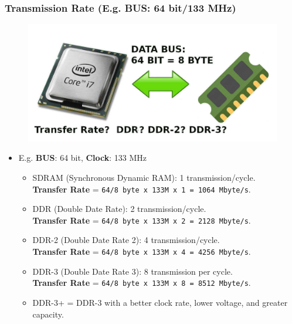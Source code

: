 \documentclass[aspectratio=169, xcolor=table, notheorems, hyperref={pdfpagelabels=false}]{beamer}
\begin{document}
\begin{frame}
\frametitle{Transmission Rate (E.g. \textbf{BUS}: 64 bit/133 MHz)}
\begin{figure}
\includegraphics[width=0.40\linewidth]{os-transfer-rate}
\end{figure}
\begin{itemize}
\item E.g. \textbf{BUS}: 64 bit, \textbf{Clock}: 133 MHz
\begin{itemize}
\item SDRAM (Synchronous Dynamic RAM): 1 transmission/cycle.\\
\textbf{Transfer Rate} = \texttt{64/8 byte x 133M x 1 = 1064 Mbyte/s}.
\item DDR (Double Date Rate): 2 transmission/cycle.\\
\textbf{Transfer Rate} = \texttt{64/8 byte x 133M x 2 = 2128 Mbyte/s}.
\item DDR-2 (Double Date Rate 2): 4 transmission/cycle.\\
\textbf{Transfer Rate} = \texttt{64/8 byte x 133M x 4 = 4256 Mbyte/s}.
\item DDR-3 (Double Date Rate 3): 8 transmission per cycle.\\
\textbf{Transfer Rate} = \texttt{64/8 byte x 133M x 8 = 8512 Mbyte/s}.
\item DDR-3+ = DDR-3 with a better clock rate, lower voltage, and greater capacity.
\end{itemize}
\end{itemize}
\end{frame}
\end{document}
